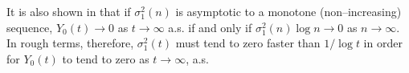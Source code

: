 \documentclass[a4paper,10pt,reqno]{amsart}
\numberwithin{equation}{section}
\newtheorem{theorem}{Theorem}
\theoremstyle{definition}
\theoremstyle{remark}
\DeclareMathOperator{\1}{\mathbbm 1}
\begin{document}
%
It is also shown in \cite{ACR:2011(DCDS)} that if $\sigma^2_1(n)$ is asymptotic to a monotone (non--increasing) sequence, $Y_0(t)\to 0$ as $t\to\infty$ a.s. if and only if $\sigma^2_1(n) \log n \to 0$ as $n\to\infty$. In rough terms, therefore,  $\sigma^2_1(t)$ must tend to zero faster than $1/\log t$ in order for $Y_0(t)$ to tend to zero as $t\to\infty$, a.s. 
\end{document}
